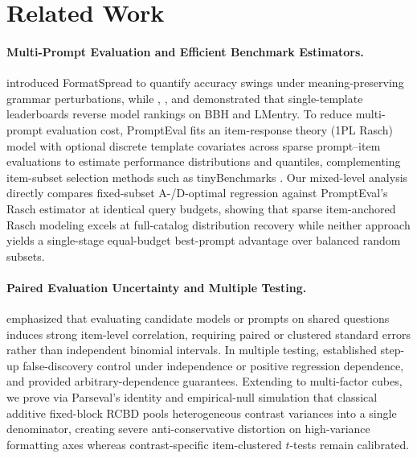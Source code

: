 \documentclass[11pt,a4paper]{article}
\begin{document}
\section{Related Work}
\paragraph{Multi-Prompt Evaluation and Efficient Benchmark Estimators.}
\citet{sclar2024quantifying} introduced FormatSpread to quantify accuracy swings under meaning-preserving grammar perturbations, while \citet{mizrahi2024state}, \citet{habba2025dove}, and \citet{habba2025promptsuite} demonstrated that single-template leaderboards reverse model rankings on BBH and LMentry. To reduce multi-prompt evaluation cost, PromptEval \citep{polo2024efficient} fits an item-response theory (1PL Rasch) model with optional discrete template covariates across sparse prompt--item evaluations to estimate performance distributions and quantiles, complementing item-subset selection methods such as tinyBenchmarks \citep{polo2024tinybenchmarks}. Our mixed-level analysis directly compares fixed-subset A-/D-optimal regression against PromptEval's Rasch estimator at identical query budgets, showing that sparse item-anchored Rasch modeling excels at full-catalog distribution recovery while neither approach yields a single-stage equal-budget best-prompt advantage over balanced random subsets.

\paragraph{Paired Evaluation Uncertainty and Multiple Testing.}
\citet{miller2024adding} emphasized that evaluating candidate models or prompts on shared questions induces strong item-level correlation, requiring paired or clustered standard errors rather than independent binomial intervals. In multiple testing, \citet{benjamini1995controlling} established step-up false-discovery control under independence or positive regression dependence, and \citet{benjamini2001control} provided arbitrary-dependence guarantees. Extending \citet{miller2024adding} to multi-factor cubes, we prove via Parseval's identity and empirical-null simulation that classical additive fixed-block RCBD \citep{montgomery2017design} pools heterogeneous contrast variances into a single denominator, creating severe anti-conservative distortion on high-variance formatting axes whereas contrast-specific item-clustered $t$-tests remain calibrated.
\end{document}

